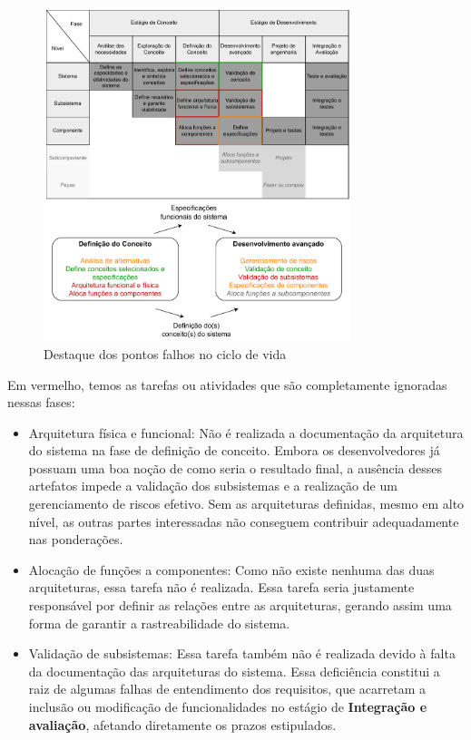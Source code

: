 	\begin{figure}[!htb]
		\centering
		\includegraphics[width=0.8\textwidth]{./figuras/lifeCycleIssues.pdf}
		\caption{Destaque dos pontos falhos no ciclo de vida}
		\label{fig:metodologia:lifeCycleIssues}
	\end{figure}

	Em vermelho, temos as tarefas ou atividades que são completamente ignoradas nessas fases:
	\begin{itemize}
		\item Arquitetura física e funcional: Não é realizada a documentação da arquitetura do 
		sistema na fase de definição de conceito. Embora os desenvolvedores já possuam uma boa 
		noção de como seria o resultado final, a ausência desses artefatos impede a validação 
		dos subsistemas e a realização de um gerenciamento de riscos efetivo. Sem as arquiteturas 
		definidas, mesmo em alto nível, as outras partes interessadas não conseguem contribuir 
		adequadamente nas ponderações.
		\item Alocação de funções a componentes: Como não existe nenhuma das duas arquiteturas, 
		essa tarefa não é realizada. Essa tarefa seria justamente responsável por definir as 
		relações entre as arquiteturas, gerando assim uma forma de garantir a rastreabilidade do 
		sistema.
		\item Validação de subsistemas: Essa tarefa também não é realizada devido à falta da 
		documentação das arquiteturas do sistema. Essa deficiência constitui a raiz de algumas 
		falhas de entendimento dos requisitos, que acarretam a inclusão ou modificação de 
		funcionalidades no estágio de \textbf{Integração e avaliação}, afetando diretamente os 
		prazos estipulados.
	\end{itemize}

